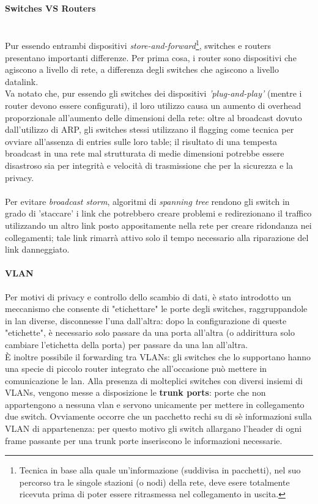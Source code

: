\paragraph{Switches VS Routers}\hfil\\
Pur essendo entrambi dispositivi \textit{store-and-forward}\footnote{Tecnica in base alla quale un'informazione (suddivisa in pacchetti), nel suo percorso tra le singole stazioni (o nodi) della rete, deve esere totalmente ricevuta prima di poter essere ritrasmessa nel collegamento in uscita.}, switches e routers presentano importanti differenze. Per prima cosa, i router sono dispositivi che agiscono a livello di rete, a differenza degli switches che agiscono a livello datalink.\\
Va notato che, pur essendo gli switches dei dispositivi \textit{'plug-and-play'} (mentre i router devono essere configurati), il loro utilizzo causa un aumento di overhead proporzionale all'aumento delle dimensioni della rete: oltre al broadcast dovuto dall'utilizzo di ARP, gli switches stessi utilizzano il flagging come tecnica per ovviare all'assenza di entries sulle loro table; il risultato di una tempesta broadcast in una rete mal strutturata di medie dimensioni potrebbe essere disastroso sia per integrità e velocità di trasmissione che per la sicurezza e la privacy.\\\\
Per evitare \textit{broadcast storm}, algoritmi di \textit{spanning tree} rendono gli switch in grado di 'staccare' i link che potrebbero creare problemi e redirezionano il traffico utilizzando un altro link posto appositamente nella rete per creare ridondanza nei collegamenti; tale link rimarrà attivo solo il tempo necessario alla riparazione del link danneggiato.
\paragraph{VLAN}
Per motivi di privacy e controllo dello scambio di dati, è stato introdotto un meccanismo che consente di "etichettare" le porte degli switches, raggruppandole in lan diverse, disconnesse l'una dall'altra: dopo la configurazione di queste "etichette", è necessario solo passare da una porta all'altra (o addirittura solo cambiare l'etichetta della porta) per passare da una lan all'altra.\\
È inoltre possibile il forwarding tra VLANs: gli switches che lo supportano hanno una specie di piccolo router integrato che all'occasione può mettere in comunicazione le lan. Alla presenza di molteplici switches con diversi insiemi di VLANs, vengono messe a disposizione le \textbf{trunk ports}: porte che non appartengono a nessuna vlan e servono unicamente per mettere in collegamento due switch. Ovviamente occorre che un pacchetto rechi su di sè informazioni sulla VLAN di appartenenza: per questo motivo gli switch allargano l'header di ogni frame passante per una trunk porte inseriscono le informazioni necessarie.\\
\newpage
